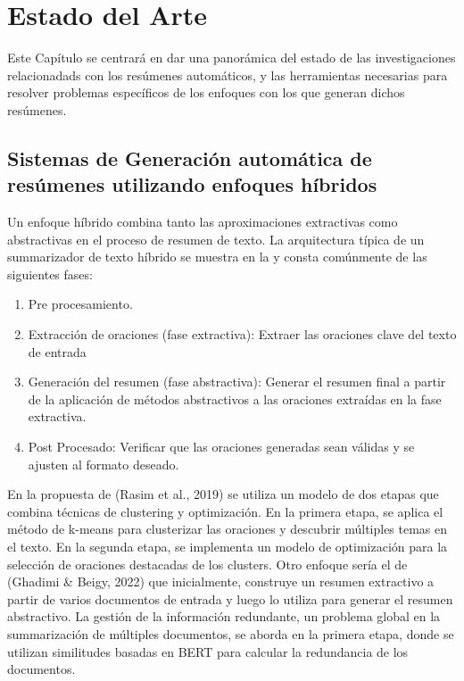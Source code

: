 \chapter{Estado del Arte}\label{chapter:state-of-the-art}
    Este Cap\'itulo se centrar\'a en dar una panor\'amica del estado de las investigaciones relacionadads con los res\'umenes autom\'aticos, y las herramientas necesarias para resolver problemas espec\'ificos de los enfoques con los que generan dichos res\'umenes.

\section{Sistemas de Generaci\'on autom\'atica de res\'umenes utilizando enfoques h\'ibridos}

Un enfoque híbrido combina tanto las aproximaciones extractivas como abstractivas en el proceso de resumen de texto. La arquitectura típica de un summarizador de texto híbrido se muestra en la y consta comúnmente de las siguientes fases:
\begin{enumerate}
    \item Pre procesamiento.
    \item Extracción de oraciones (fase extractiva): Extraer las oraciones clave del texto de entrada \cite[(Wang et al., 2017)]{Wang}
    \item Generaci\'on del resumen (fase abstractiva): Generar el resumen final a partir de la aplicaci\'on de m\'etodos abstractivos a las oraciones extra\'idas en la fase extractiva.
    \item Post Procesado: Verificar que las oraciones generadas sean v\'alidas y se ajusten al formato deseado.
\end{enumerate}


En la propuesta de (Rasim et al., 2019)\cite{cosum} se utiliza un modelo de dos etapas que combina técnicas de clustering y optimización. En la primera etapa, se aplica el método de k-means para clusterizar las oraciones y descubrir múltiples temas en el texto. En la segunda etapa, se implementa un modelo de optimización para la selección de oraciones destacadas de los clusters. Otro enfoque ser\'ia el de (Ghadimi \& Beigy, 2022)\cite{hybrid-llm} que inicialmente, construye un resumen extractivo a partir de varios documentos de entrada y luego lo utiliza para generar el resumen abstractivo. La gestión de la información redundante, un problema global en la summarización de múltiples documentos, se aborda en la primera etapa, donde se utilizan similitudes basadas en BERT\cite{BERT} para calcular la redundancia de los documentos.

